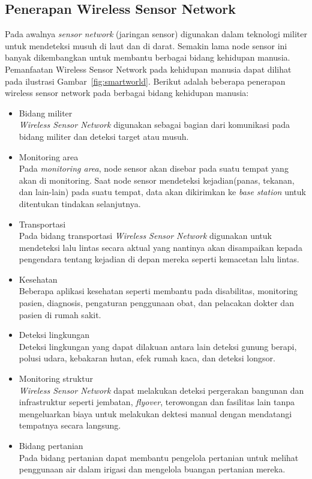 \subsection{Penerapan Wireless Sensor Network}
Pada awalnya \textit{sensor network} (jaringan sensor) digunakan dalam teknologi militer untuk mendeteksi musuh di laut dan di darat. Semakin lama node sensor ini banyak dikembangkan untuk membantu berbagai bidang kehidupan manusia. Pemanfaatan Wireless Sensor Network pada kehidupan manusia dapat dilihat pada ilustrasi Gambar~\ref{fig:smartworld}. Berikut adalah beberapa penerapan wireless sensor network pada berbagai bidang kehidupan manusia:
\begin{itemize}
\item Bidang militer\\
\textit{Wireless Sensor Network} digunakan sebagai bagian dari komunikasi pada bidang militer dan deteksi target atau musuh.

\item Monitoring area\\
Pada \textit{monitoring area}, node sensor akan disebar pada suatu tempat yang akan di monitoring. Saat node sensor mendeteksi kejadian(panas, tekanan, dan lain-lain) pada suatu tempat, data akan dikirimkan ke \textit{base station} untuk ditentukan tindakan selanjutnya.

\item Transportasi\\
Pada bidang transportasi \textit{Wireless Sensor Network} digunakan untuk mendeteksi lalu lintas secara aktual yang nantinya akan disampaikan kepada pengendara tentang kejadian di depan mereka seperti kemacetan lalu lintas. 

\item Kesehatan\\
Beberapa aplikasi kesehatan seperti membantu pada disabilitas, monitoring pasien, diagnosis, pengaturan penggunaan obat, dan pelacakan dokter dan pasien di rumah sakit.

\item Deteksi lingkungan\\
Deteksi lingkungan yang dapat dilakuan antara lain deteksi gunung berapi, polusi udara, kebakaran hutan, efek rumah kaca, dan deteksi longsor.

\item Monitoring struktur\\
\textit{Wireless Sensor Network} dapat melakukan deteksi pergerakan bangunan dan infrastruktur seperti jembatan, \textit{flyover}, terowongan dan fasilitas lain tanpa mengeluarkan biaya untuk melakukan dektesi manual dengan mendatangi tempatnya secara langsung.

\item Bidang pertanian\\
Pada bidang pertanian dapat membantu pengelola pertanian untuk melihat penggunaan air dalam irigasi dan mengelola buangan pertanian mereka.
\end{itemize}

